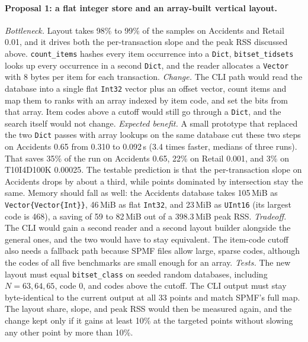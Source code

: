 \paragraph{Proposal 1: a flat integer store and an array-built vertical layout.}
\emph{Bottleneck.} Layout takes 98\% to 99\% of the samples on Accidents and Retail 0.01,
and it drives both the per-transaction slope and the peak RSS discussed above.
\texttt{count\_items} hashes every item occurrence into a \texttt{Dict},
\texttt{bitset\_tidsets} looks up every occurrence in a second \texttt{Dict}, and the
reader allocates a \texttt{Vector} with 8 bytes per item for each transaction.
\emph{Change.} The CLI path would read the database into a single flat \texttt{Int32}
vector plus an offset vector, count items and map them to ranks with an array indexed by
item code, and set the bits from that array. Item codes above a cutoff would still go
through a \texttt{Dict}, and the search itself would not change. \emph{Expected benefit.}
A small prototype that replaced the two \texttt{Dict} passes with array lookups on the
same database cut these two steps on Accidents 0.65 from 0.310 to 0.092\,s (3.4 times
faster, medians of three runs). That saves 35\% of the run on Accidents 0.65, 22\% on
Retail 0.001, and 3\% on T10I4D100K 0.00025. The testable prediction is that the
per-transaction slope on Accidents drops by about a third, while points dominated by
intersection stay the same. Memory should fall as well: the Accidents database takes
105\,MiB as \texttt{Vector\{Vector\{Int\}\}}, 46\,MiB as flat \texttt{Int32}, and
23\,MiB as \texttt{UInt16} (its largest code is 468), a saving of 59 to 82\,MiB out of a
398.3\,MiB peak RSS. \emph{Tradeoff.} The CLI would gain a second reader and a second
layout builder alongside the general ones, and the two would have to stay equivalent. The
item-code cutoff also needs a fallback path because SPMF files allow large, sparse codes,
although the codes of all five benchmarks are small enough for an array. \emph{Tests.} The
new layout must equal \texttt{bitset\_class} on seeded random databases, including
$N = 63, 64, 65$, code 0, and codes above the cutoff. The CLI output must stay
byte-identical to the current output at all 33 points and match SPMF's full map. The
layout share, slope, and peak RSS would then be measured again, and the change kept only
if it gains at least 10\% at the targeted points without slowing any other point by more
than 10\%.


